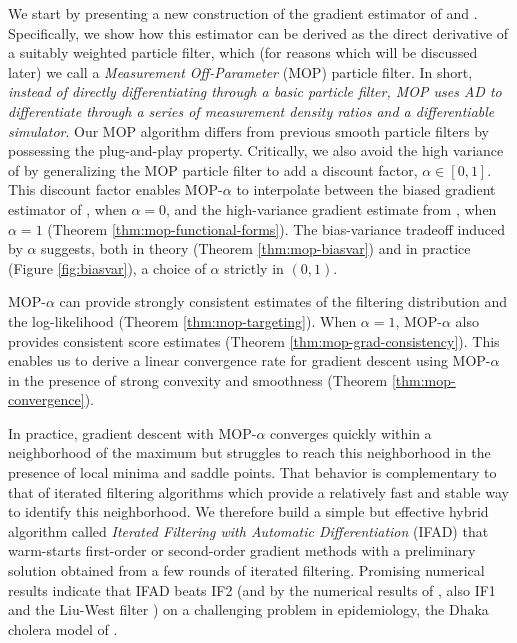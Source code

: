 \documentclass[9pt,twocolumn,pnasresearcharticle]{pnas-new}
\begin{document}
We start by presenting a new construction of the gradient estimator of \cite{scibior21} and \cite{poyiadjis11}.
Specifically, we show how this estimator can be derived as the direct derivative of a suitably weighted particle filter, which (for reasons which will be discussed later) we call a {\it Measurement Off-Parameter} (MOP) particle filter. 
In short, \textit{instead of directly differentiating through a basic particle filter, MOP uses AD to differentiate through a series of measurement density ratios and a differentiable simulator}. 
Our MOP algorithm differs from previous smooth particle filters \cite{svensson18,malik11} by possessing the plug-and-play property.
Critically, we also avoid the high variance of \cite{svensson18} by generalizing the MOP particle filter to add a discount factor, $\alpha \in [0,1]$.
This discount factor enables MOP-$\alpha$ to interpolate between the  biased gradient estimator of \cite{naesseth18}, when $\alpha=0$, and the high-variance gradient estimate from \cite{poyiadjis11, scibior21}, when $\alpha=1$ (Theorem \ref{thm:mop-functional-forms}).
The bias-variance tradeoff induced by $\alpha$ suggests, both in theory (Theorem \ref{thm:mop-biasvar}) and in practice (Figure \ref{fig:biasvar}), a choice of $\alpha$ strictly in $(0,1)$.

MOP-$\alpha$ can provide strongly consistent estimates of the filtering distribution and the log-likelihood (Theorem \ref{thm:mop-targeting}).
When $\alpha=1$, MOP-$\alpha$ also provides consistent score estimates (Theorem \ref{thm:mop-grad-consistency}). This enables us to derive a linear convergence rate for gradient descent using MOP-$\alpha$ in the  presence of strong convexity and smoothness (Theorem \ref{thm:mop-convergence}).

In practice, gradient descent with MOP-$\alpha$ converges quickly within a neighborhood of the maximum but struggles to reach this neighborhood in the presence of local minima and saddle points.
That behavior is complementary to that of iterated filtering algorithms \cite{ionides06-pnas,ionides15} which provide a relatively fast and stable way to identify this neighborhood.
We therefore build a simple but effective hybrid algorithm called {\it Iterated Filtering with Automatic Differentiation} (IFAD) that warm-starts first-order or second-order gradient methods with a preliminary solution obtained from a few rounds of iterated filtering.
Promising numerical results indicate that IFAD beats IF2 (and by the numerical results of \cite{ionides15}, also IF1 \cite{ionides06-pnas,ionides11} and the Liu-West filter \cite{liuwest01}) on a challenging problem in epidemiology, the Dhaka cholera model of \cite{king08}.
\end{document}
